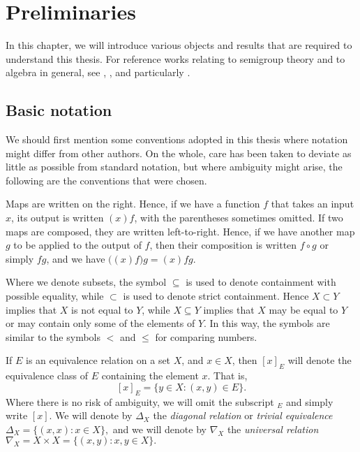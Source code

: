 \chapter{Preliminaries}
\label{chap:intro}

In this chapter, we will introduce various objects and results that are required
to understand this thesis.  For reference works relating to semigroup theory and
to algebra in general, see \cite{warner}, \cite{petrich}, and particularly
\cite{howie}.

\section{Basic notation}
\label{sec:intro-notation}

We should first mention some conventions adopted in this thesis where notation
might differ from other authors.  On the whole, care has been taken to deviate
as little as possible from standard notation, but where ambiguity might arise,
the following are the conventions that were chosen.

Maps are written on the right.  Hence, if we have a function $f$ that takes an
input $x$, its output is written $(x)f$, with the parentheses sometimes omitted.
If two maps are composed, they are written left-to-right.  Hence, if we have
another map $g$ to be applied to the output of $f$, then their composition is
written $f \circ g$ or simply $fg$, and we have
$\big((x)f\big)g = (x)fg.$

Where we denote subsets, the symbol $\subseteq$ is used to denote containment
with possible equality, while $\subset$ is used to denote strict containment.
Hence $X \subset Y$ implies that $X$ is not equal to $Y$, while $X \subseteq Y$
implies that $X$ may be equal to $Y$ or may contain only some of the elements of
$Y$.  In this way, the symbols are similar to the symbols $<$ and $\leq$ for
comparing numbers.

If $E$ is an equivalence relation on a set $X$, and $x \in X$, then $[x]_E$ will
denote the equivalence class of $E$ containing the element $x$.  That is,
$$[x]_E = \{y \in X : (x,y) \in E\}.$$
Where there is no risk of ambiguity, we will omit the subscript $_E$ and simply
write $[x]$.  We will denote by $\Delta_X$ the \textit{diagonal relation} or
\textit{trivial equivalence}
$\Delta_X = \{(x,x): x \in X\},$
and we will denote by $\nabla_X$ the \textit{universal relation}
$\nabla_X = X \times X = \{(x,y): x,y \in X\}.$

